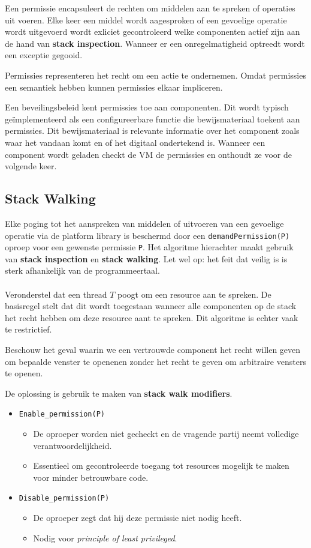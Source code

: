 \documentclass[../main.tex]{subfiles}
\begin{document}
Een permissie encapsuleert de rechten om middelen aan te spreken of operaties uit voeren. Elke keer een middel wordt aagesproken of een gevoelige operatie wordt uitgevoerd wordt exliciet gecontroleerd welke componenten actief zijn aan de hand van \textbf{stack inspection}. Wanneer er een onregelmatigheid optreedt wordt een exceptie gegooid.

Permissies representeren het recht om een actie te ondernemen. Omdat permissies een semantiek hebben kunnen permissies elkaar impliceren. 

Een beveilingsbeleid kent permissies toe aan componenten. Dit wordt typisch ge\"implementeerd als een configureerbare functie die bewijsmateriaal toekent aan permissies. Dit bewijsmateriaal is relevante informatie over het component zoals waar het vandaan komt en of het digitaal ondertekend is. Wanneer een component wordt geladen checkt de VM de permissies en onthoudt ze voor de volgende keer. 



\subsection{Stack Walking}
Elke poging tot het aanspreken van middelen of uitvoeren van een gevoelige operatie via de platform library is beschermd door een \texttt{demandPermission(P)} oproep voor een gewenste permissie \texttt{P}. Het algoritme hierachter maakt gebruik van \textbf{stack inspection} en \textbf{stack walking}. Let wel op: het feit dat veilig is is sterk afhankelijk van de programmeertaal.
\\\\
Veronderstel dat een thread $T$ poogt om een resource aan te spreken. De basisregel stelt dat dit wordt toegestaan wanneer alle componenten op de stack het recht hebben om deze resource aant te spreken. Dit algoritme is echter vaak te restrictief.

\begin{blockquote}
Beschouw het geval waarin we een vertrouwde component het recht willen geven om bepaalde venster te openenen zonder het recht te geven om arbitraire vensters te openen.
\end{blockquote}
\noindent
De oplossing is gebruik te maken van \textbf{stack walk modifiers}.
\begin{itemize}
	\item \texttt{Enable\_permission(P)}
	\begin{itemize}
		\item De oproeper worden niet gecheckt en de vragende partij neemt volledige verantwoordelijkheid.
		\item Essentieel om gecontroleerde toegang tot resources mogelijk te maken voor minder betrouwbare code.
	\end{itemize}
	\item \texttt{Disable\_permission(P)}
	\begin{itemize}
		\item De oproeper zegt dat hij deze permissie niet nodig heeft.
		\item Nodig voor \textit{principle of least privileged}.
	\end{itemize}
\end{itemize}
\end{document}
